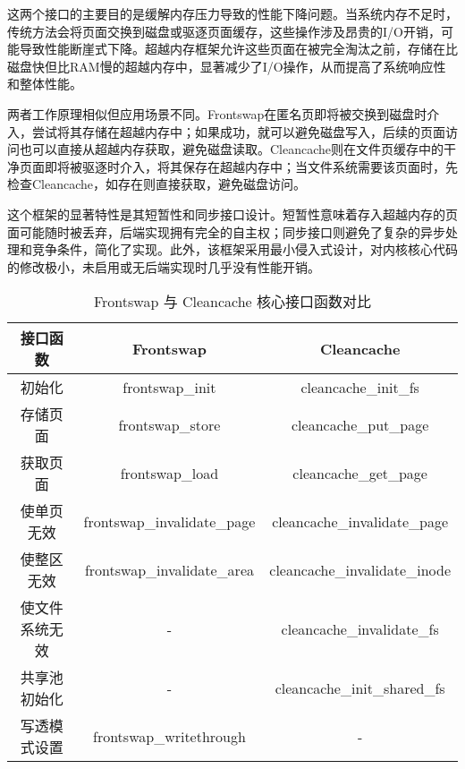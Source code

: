 这两个接口的主要目的是缓解内存压力导致的性能下降问题。当系统内存不足时，传统方法会将页面交换到磁盘或驱逐页面缓存，这些操作涉及昂贵的I/O开销，可能导致性能断崖式下降。超越内存框架允许这些页面在被完全淘汰之前，存储在比磁盘快但比RAM慢的超越内存中，显著减少了I/O操作，从而提高了系统响应性和整体性能。

两者工作原理相似但应用场景不同。Frontswap在匿名页即将被交换到磁盘时介入，尝试将其存储在超越内存中；如果成功，就可以避免磁盘写入，后续的页面访问也可以直接从超越内存获取，避免磁盘读取。Cleancache则在文件页缓存中的干净页面即将被驱逐时介入，将其保存在超越内存中；当文件系统需要该页面时，先检查Cleancache，如存在则直接获取，避免磁盘访问。

这个框架的显著特性是其短暂性和同步接口设计。短暂性意味着存入超越内存的页面可能随时被丢弃，后端实现拥有完全的自主权；同步接口则避免了复杂的异步处理和竞争条件，简化了实现。此外，该框架采用最小侵入式设计，对内核核心代码的修改极小，未启用或无后端实现时几乎没有性能开销。

\begin{table}[htbp]
    \caption{Frontswap 与 Cleancache 核心接口函数对比}
    \begin{tabularx}{\textwidth}{ccc} %
    \toprule
    \textbf{接口函数} & \textbf{Frontswap} & \textbf{Cleancache} \\
    \midrule
    初始化 & frontswap\_init & cleancache\_init\_fs \\

    存储页面 & frontswap\_store & cleancache\_put\_page \\

    获取页面 & frontswap\_load & cleancache\_get\_page \\

    使单页无效 & frontswap\_invalidate\_page & cleancache\_invalidate\_page \\

    使整区无效 & frontswap\_invalidate\_area & cleancache\_invalidate\_inode \\

    使文件系统无效 & - & cleancache\_invalidate\_fs \\

    共享池初始化 & - & cleancache\_init\_shared\_fs \\

    写透模式设置 & frontswap\_writethrough & - \\
    \bottomrule
    \end{tabularx}
\end{table}


